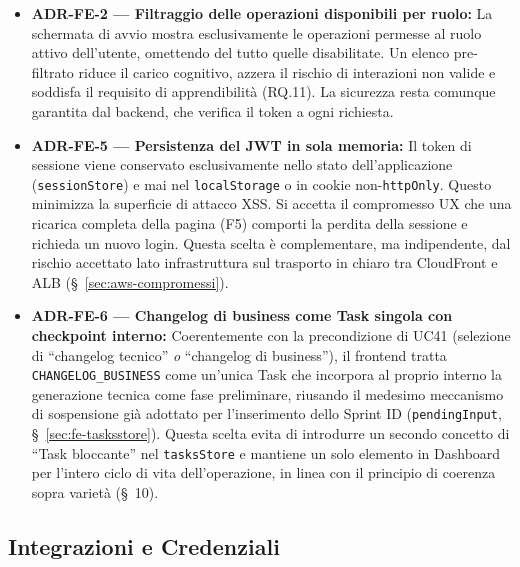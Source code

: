 \documentclass[11pt,a4paper]{article}
\begin{document}
\begin{itemize}
    \item \textbf{ADR-FE-2 --- Filtraggio delle operazioni disponibili per ruolo:} La schermata di avvio mostra esclusivamente le operazioni permesse al ruolo attivo dell'utente, omettendo del tutto quelle disabilitate. Un elenco pre-filtrato riduce il carico cognitivo, azzera il rischio di interazioni non valide e soddisfa il requisito di apprendibilità (RQ.11). La sicurezza resta comunque garantita dal backend, che verifica il token a ogni richiesta.
    \item \textbf{ADR-FE-5 --- Persistenza del JWT in sola memoria:} Il token di sessione viene conservato esclusivamente nello stato dell'applicazione (\texttt{sessionStore}) e mai nel \texttt{localStorage} o in cookie non-\texttt{httpOnly}. Questo minimizza la superficie di attacco XSS. Si accetta il compromesso UX che una ricarica completa della pagina (F5) comporti la perdita della sessione e richieda un nuovo login. Questa scelta è complementare, ma indipendente, dal rischio accettato lato infrastruttura sul trasporto in chiaro tra CloudFront e ALB (\S~\ref{sec:aws-compromessi}).
    \item \textbf{ADR-FE-6 --- Changelog di business come Task singola con checkpoint interno:} Coerentemente con la precondizione di UC41 (selezione di ``changelog tecnico'' \emph{o} ``changelog di business''), il frontend tratta \texttt{CHANGELOG\_BUSINESS} come un'unica Task che incorpora al proprio interno la generazione tecnica come fase preliminare, riusando il medesimo meccanismo di sospensione già adottato per l'inserimento dello Sprint ID (\texttt{pendingInput}, \S~\ref{sec:fe-tasksstore}). Questa scelta evita di introdurre un secondo concetto di ``Task bloccante'' nel \texttt{tasksStore} e mantiene un solo elemento in Dashboard per l'intero ciclo di vita dell'operazione, in linea con il principio di coerenza sopra varietà (\S~10).
\end{itemize}

\subsection{Integrazioni e Credenziali}
\end{document}
